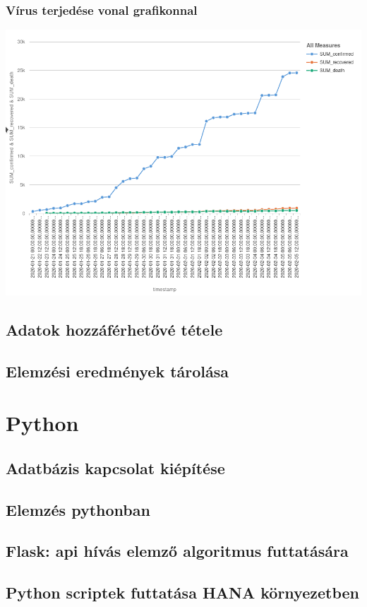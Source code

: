 \documentclass[12pt,a4papaer]{article}
\begin{document}
    \subsubsection{Vírus terjedése vonal grafikonnal}
    \includegraphics[width=\textwidth]{sum_ww}
    \subsection{Adatok hozzáférhetővé tétele}
    \subsection{Elemzési eredmények tárolása}
    \newpage
    \section{Python}
    \subsection{Adatbázis kapcsolat kiépítése}
    \subsection{Elemzés pythonban}
    \subsection{Flask: api hívás elemző algoritmus futtatására}
    \subsection{Python scriptek futtatása HANA környezetben}
\end{document}
